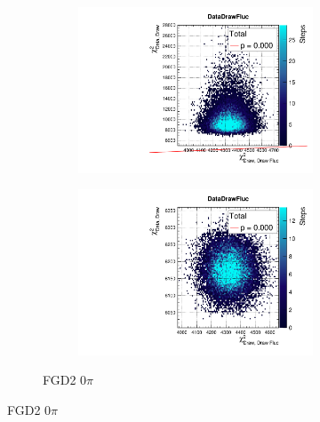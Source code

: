 \begin{figure}[h]
\begin{subfigure}[t]{\textwidth}
\begin{subfigure}[t]{0.24\textwidth}
			\includegraphics[width=\textwidth, trim={0mm 0mm 0mm 8mm}, clip,page=38]{figures/mach3/2018/data/2018a_FixedCov_RedCov_Mpi_Data_merge_PriorPred_procs}
		\end{subfigure}
		\begin{subfigure}[t]{0.24\textwidth}
			\includegraphics[width=\textwidth, trim={0mm 0mm 0mm 8mm}, clip,page=38]{figures/mach3/2018/data/2018a_FixedCov_RedCov_Mpi_Data_merge_PostPredStore_FullLLH_procs}
		\end{subfigure}
		\caption{FGD2 0$\pi$}
	\end{subfigure}
	

\end{figure}
